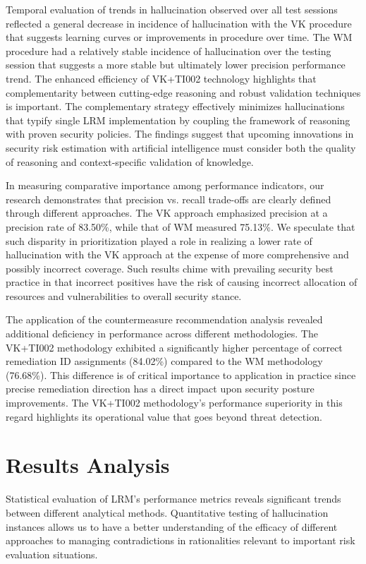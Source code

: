 \documentclass[sigconf]{acmart}
\begin{document}
Temporal evaluation of trends in hallucination observed over all test sessions reflected a general decrease in incidence of hallucination with the VK procedure that suggests learning curves or improvements in procedure over time. The WM procedure had a relatively stable incidence of hallucination over the testing session that suggests a more stable but ultimately lower precision performance trend. The enhanced efficiency of VK+TI002 technology highlights that complementarity between cutting-edge reasoning and robust validation techniques is important. The complementary strategy effectively minimizes hallucinations that typify single LRM implementation by coupling the framework of reasoning with proven security policies. The findings suggest that upcoming innovations in security risk estimation with artificial intelligence must consider both the quality of reasoning and context-specific validation of knowledge.

In measuring comparative importance among performance indicators, our research demonstrates that precision vs. recall trade-offs are clearly defined through different approaches. The VK approach emphasized precision at a precision rate of 83.50\%, while that of WM measured 75.13\%. We speculate that such disparity in prioritization played a role in realizing a lower rate of hallucination with the VK approach at the expense of more comprehensive and possibly incorrect coverage. Such results chime with prevailing security best practice in that incorrect positives have the risk of causing incorrect allocation of resources and vulnerabilities to overall security stance.

The application of the countermeasure recommendation analysis revealed additional deficiency in performance across different methodologies. The VK+TI002 methodology exhibited a significantly higher percentage of correct remediation ID assignments (84.02\%) compared to the WM methodology (76.68\%). This difference is of critical importance to application in practice since precise remediation direction has a direct impact upon security posture improvements. The VK+TI002 methodology's performance superiority in this regard highlights its operational value that goes beyond threat detection.

\section{Results Analysis}

Statistical evaluation of LRM's performance metrics reveals significant trends between different analytical methods. Quantitative testing of hallucination instances allows us to have a better understanding of the efficacy of different approaches to managing contradictions in rationalities relevant to important risk evaluation situations.
\end{document}
